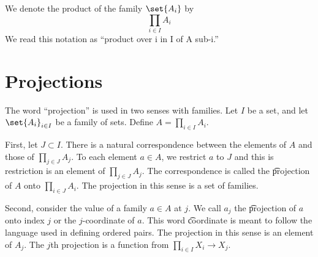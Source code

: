 We denote the product of the family $\set{A_i}$ by
\[
\prod_{i \in I} A_i
\]
We read this notation as ``product over i in I of A sub-i.''


\section*{Projections}

The word ``projection'' is used in two senses with families.
Let $I$ be a set, and let $\set{A_i}_{i \in I}$ be a family of sets.
Define $A = \prod_{i \in I} A_i$.

First, let $J \subset I$.
There is a natural correspondence between the elements of $A$ and those of $\prod_{j \in J} A_j$.
To each element $a \in A$, we restrict $a$ to $J$ and this is restriction is an element of $\prod_{j \in J} A_j$.
The correspondence is called the \t{projection} of $A$ onto $\prod_{i \in J} A_i$.
The projection in this sense is a set of families.

Second, consider the value of a family $a \in A$ at $j$.
We call $a_j$ the \t{projection of $a$ onto index $j$} or the \t{$j$-coordinate} of $a$.
This word \t{coordinate} is meant to follow the language used in defining ordered pairs.
The projection in this sense is an element of $A_j$.
The $j$th projection is a function from $\prod_{i \in I} X_i \to X_j$.
